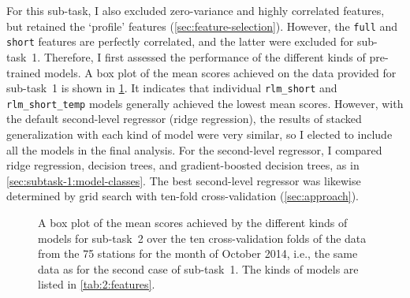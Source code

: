 \documentclass[11pt]{extarticle}
\newcommand{\rlmfull}{\texttt{rlm\_full}}
\newcommand{\rlmfulltemp}{\texttt{rlm\_full\_temp}}
\newcommand{\rlmshort}{\texttt{rlm\_short}}
\newcommand{\rlmshortfull}{\texttt{rlm\_short\_full}}
\newcommand{\rlmshortfulltemp}{\texttt{rlm\_short\_full\_temp}}
\newcommand{\rlmshorttemp}{\texttt{rlm\_short\_temp}}
\begin{document}
For this sub-task, I also excluded zero-variance and highly correlated features, but
retained the `profile' features (\cref{sec:feature-selection}).
However, the \texttt{full} and \texttt{short} features are perfectly correlated, and
the latter were excluded for sub-task~1.
Therefore, I first assessed the performance of the different kinds of pre-trained
models.
A box plot of the mean scores achieved on the data provided for sub-task~1 is shown in
\cref{fig:2:box-plot}.
It indicates that individual \rlmshort{} and \rlmshorttemp{} models generally achieved
the lowest mean scores.
However, with the default second-level regressor (ridge regression), the results of
stacked generalization with each kind of model were very similar, so I elected to
include all the models in the final analysis.
For the second-level regressor, I compared ridge regression, decision trees, and
gradient-boosted decision trees, as in \cref{sec:subtask-1:model-classes}.
The best second-level regressor was likewise determined by grid search with ten-fold
cross-validation (\cref{sec:approach}).

\begin{figure}
  \centering
  \caption{A box plot of the mean scores achieved by the different kinds of models for
    sub-task~2 over the ten cross-validation folds of the data from the 75 stations for
    the month of October 2014, i.e., the same data as for the second case of sub-task~1.
    The kinds of models are listed in \cref{tab:2:features}.
  }
  \label{fig:2:box-plot}
\end{figure}
\end{document}
